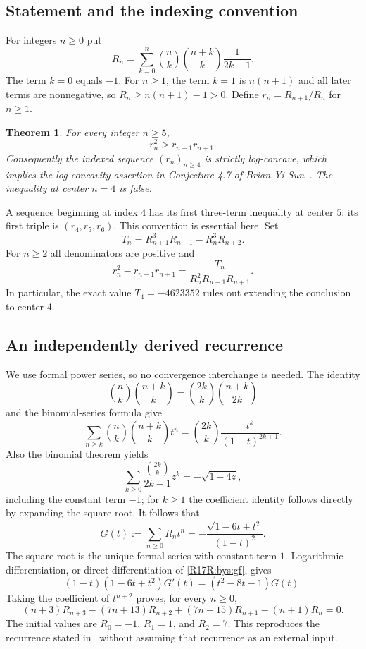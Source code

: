 \documentclass[11pt,a4paper]{article}
\newtheorem{SourceRbhRtheorem}{Theorem}
\begin{document}
\subsection{Statement and the indexing convention}
For integers $n\ge0$ put
\[
 R_n=\sum_{k=0}^n\binom nk\binom{n+k}k\frac1{2k-1}.
\]
The term $k=0$ equals $-1$. For $n\ge1$, the term $k=1$
is $n(n+1)$ and all later terms are nonnegative, so
$R_n\ge n(n+1)-1>0$. Define $r_n=R_{n+1}/R_n$ for $n\ge1$.

\begin{SourceRbhRtheorem}\label{R17R:bys:main}
For every integer $n\ge5$,
\[
 r_n^2>r_{n-1}r_{n+1}.
\]
Consequently the indexed sequence $(r_n)_{n\ge4}$ is strictly
log-concave, which implies the log-concavity assertion in
Conjecture 4.7 of Brian Yi Sun~\cite{R17R:bys:sun}.
The inequality at center $n=4$ is false.
\end{SourceRbhRtheorem}

A sequence beginning at index $4$ has its first three-term inequality
at center $5$: its first triple is $(r_4,r_5,r_6)$.
This convention is essential here. Set
\begin{equation}\label{R17R:bys:T}
 T_n=R_{n+1}^3R_{n-1}-R_n^3R_{n+2}.
\end{equation}
For $n\ge2$ all denominators are positive and
\[
 r_n^2-r_{n-1}r_{n+1}
 =\frac{T_n}{R_n^2R_{n-1}R_{n+1}}.
\]
In particular, the exact value $T_4=-4623352$ rules out extending
the conclusion to center $4$.

\subsection{An independently derived recurrence}
We use formal power series, so no convergence interchange is needed.
The identity
\[
 \binom nk\binom{n+k}k
 =\binom{2k}k\binom{n+k}{2k}
\]
and the binomial-series formula give
\[
 \sum_{n\ge k}\binom nk\binom{n+k}k t^n
 =\binom{2k}k\frac{t^k}{(1-t)^{2k+1}}.
\]
Also the binomial theorem yields
\[
 \sum_{k\ge0}\frac{\binom{2k}k}{2k-1}z^k
 =-\sqrt{1-4z},
\]
including the constant term $-1$; for $k\ge1$ the coefficient identity
follows directly by expanding the square root. It follows that
\begin{equation}\label{R17R:bys:gf}
 G(t):=\sum_{n\ge0}R_nt^n
 =-\frac{\sqrt{1-6t+t^2}}{(1-t)^2}.
\end{equation}
The square root is the unique formal series with constant term $1$.
Logarithmic differentiation, or direct differentiation of
\eqref{R17R:bys:gf}, gives
\[
 (1-t)(1-6t+t^2)G'(t)=(t^2-8t-1)G(t).
\]
Taking the coefficient of $t^{n+2}$ proves, for every $n\ge0$,
\begin{equation}\label{R17R:bys:rec}
 (n+3)R_{n+3}-(7n+13)R_{n+2}
 +(7n+15)R_{n+1}-(n+1)R_n=0.
\end{equation}
The initial values are $R_0=-1$, $R_1=1$, and $R_2=7$.
This reproduces the recurrence stated in~\cite[Eq.~(1.4)]{R17R:bys:sun}
without assuming that recurrence as an external input.
\end{document}
